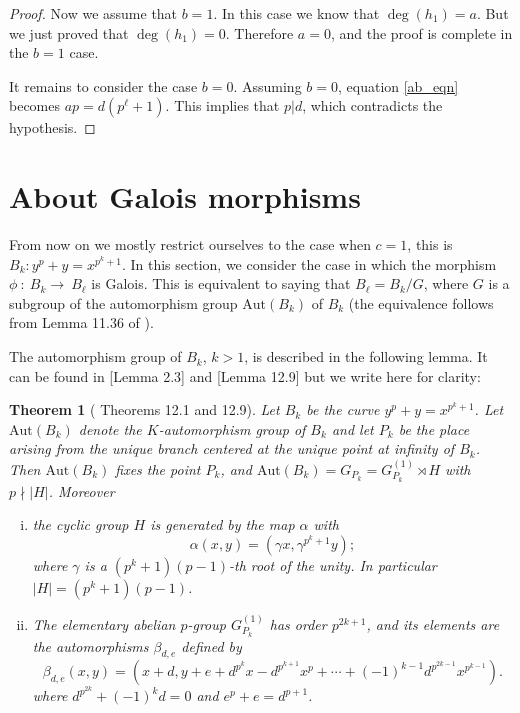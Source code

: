 \documentclass[oneside,a4paper,12pt]{article}
\theoremstyle{plain} %
\newtheorem{theorem}{Theorem}[section]
\theoremstyle{definition} %
\newcommand{\Aut}{\mathrm{Aut}}
\begin{document}
\begin{proof}
Now we assume that $b=1$. In this case we know that $\deg (h_1) =a$. 
But we just proved that $\deg (h_1) =0$.
Therefore $a=0$, and the 
proof is complete in the $b=1$ case.


It remains to consider the case $b=0$.
Assuming $b=0$, equation \eqref{ab_eqn} becomes
    $ap=d(p^\ell+1)$.
This implies that $p|d$, which contradicts the hypothesis.
\end{proof}

\section{About Galois morphisms}\label{sec: Galois morphisms}

From now on we mostly restrict ourselves to the case when $c=1$, this is $B_k: y^p+y=x^{p^k+1}$.
In this section, we consider the case in which the morphism $\phi~\colon~B_k\rightarrow~B_{\ell} $ is Galois. This is equivalent to saying that $B_{\ell}=B_k/G$, where $G$ is a subgroup of the automorphism group $\Aut(B_k)$ of $B_k$  (the equivalence follows from Lemma 11.36 of \cite{HKT}).



The automorphism group of $B_k$, $k>1$, is described in the following lemma.
It can be found in \cite{BoniniMontanucciZini}[Lemma 2.3] and \cite{HKT}[Lemma 12.9] but we write here for clarity:

\begin{theorem}[\cite{HKT} Theorems 12.1 and 12.9]\label{theo12.9}
Let $B_k$ be the curve $y^p+y=x^{p^k+1}$.
Let $\Aut(B_k)$ denote the $K$-automorphism group of $B_k$ and 
let $P_k$ be the place arising from the unique branch centered at the unique point at infinity of $B_k$. 
Then $\Aut(B_k)$ fixes the point $P_k$,  and 
$\Aut(B_k)=G_{P_k}=G^{(1)}_{P_k} \rtimes H$ with 
$p \nmid |H|$. Moreover 
    \begin{enumerate}[(i)]
        \item the cyclic group $H$ is generated by the map $\alpha$ with
        \[
        \alpha (x,y)=(\gamma x,\gamma^{p^k+1}y);
        \]
        where $\gamma$ is a $(p^k+1)(p-1)$-th root of the unity. In particular
        $|H| = (p^k+1)(p - 1)$.
        \item The elementary abelian $p$-group $G^{(1)}_{P_k}$ has order $p^{2k+1}$, and its elements are the automorphisms $\beta_{d,e}$ defined by
        \[
        \beta_{d,e}(x,y)=(x+d,y+e+d^{p^k}x-d^{p^{k+1}}x^{p}+\cdots +(-1)^{k-1}d^{p^{2k-1}}x^{p^{k-1}}).
        \]
        where $d^{p^{2k}}+(-1)^kd=0$ and $e^p+e=d^{p+1}$.
    \end{enumerate}
\end{theorem}
\end{document}
